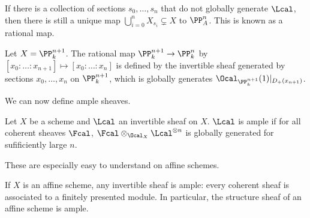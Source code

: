If there is a collection of sections $s_{0},\dots,s_{n}$ that do not globally generate $\Lcal$, then there is still a unique map $\bigcup_{i=0}^{n}X_{s_{i}}\subsetneq X$ to $\PP^{n}_{A}$. This is known as a rational map. 
\begin{example}
    Let $X=\PP^{n+1}_{k}$. The rational map $\PP^{n+1}_{k}\to\PP^{n}_{k}$ by $[x_{0}:\dots:x_{n+1}]\mapsto [x_{0}:\dots:x_{n}]$ is defined by the invertible sheaf generated by sections $x_{0},\dots,x_{n}$ on $\PP^{n+1}_{k}$, which is globally generates $\Ocal_{\PP^{n+1}_{k}}(1)|_{D_{+}(x_{n+1})}$. 
\end{example}
We can now define ample sheaves. 
\begin{definition}\label{def: ample invertible sheaf}
    Let $X$ be a scheme and $\Lcal$ an invertible sheaf on $X$. $\Lcal$ is ample if for all coherent sheaves $\Fcal$, $\Fcal\otimes_{\Ocal_{X}}\Lcal^{\otimes n}$ is globally generated for sufificiently large $n$. 
\end{definition}
These are especially easy to understand on affine schemes. 
\begin{example}
    If $X$ is an affine scheme, any invertible sheaf is ample: every coherent sheaf is associated to a finitely presented module. In particular, the structure sheaf of an affine scheme is ample. 
\end{example}